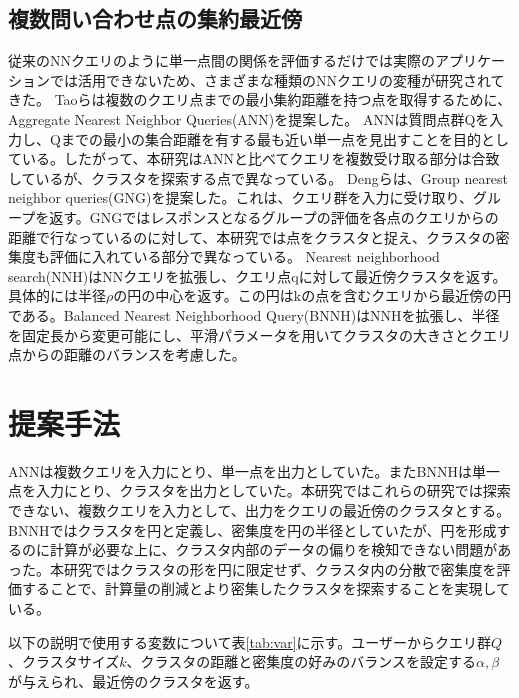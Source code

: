 \documentclass{deimj}
\theoremstyle{definition}
\begin{document}
\subsection{複数問い合わせ点の集約最近傍}
従来のNNクエリのように単一点間の関係を評価するだけでは実際のアプリケーションでは活用できないため、さまざまな種類のNNクエリの変種が研究されてきた。 Taoらは複数のクエリ点までの最小集約距離を持つ点を取得するために、Aggregate Nearest Neighbor Queries(ANN)\cite{ANN}を提案した。 ANNは質問点群Qを入力し、Qまでの最小の集合距離を有する最も近い単一点を見出すことを目的としている。したがって、本研究はANNと比べてクエリを複数受け取る部分は合致しているが、クラスタを探索する点で異なっている。 Dengらは、Group nearest neighbor queries(GNG)\cite{GNG}を提案した。これは、クエリ群を入力に受け取り、グループを返す。GNGではレスポンスとなるグループの評価を各点のクエリからの距離で行なっているのに対して、本研究では点をクラスタと捉え、クラスタの密集度も評価に入れている部分で異なっている。
Nearest neighborhood search(NNH)\cite{NNH}はNNクエリを拡張し、クエリ点qに対して最近傍クラスタを返す。具体的には半径$\rho$の円の中心を返す。この円はkの点を含むクエリから最近傍の円である。Balanced Nearest Neighborhood Query(BNNH)\cite{BNNH}はNNHを拡張し、半径を固定長から変更可能にし、平滑パラメータを用いてクラスタの大きさとクエリ点からの距離のバランスを考慮した。


\section{提案手法}

ANN\cite{ANN}は複数クエリを入力にとり、単一点を出力としていた。またBNNH\cite{BNNH}は単一点を入力にとり、クラスタを出力としていた。本研究ではこれらの研究では探索できない、複数クエリを入力として、出力をクエリの最近傍のクラスタとする。
BNNH\cite{BNNH}ではクラスタを円と定義し、密集度を円の半径としていたが、円を形成するのに計算が必要な上に、クラスタ内部のデータの偏りを検知できない問題があった。本研究ではクラスタの形を円に限定せず、クラスタ内の分散で密集度を評価することで、計算量の削減とより密集したクラスタを探索することを実現している。

以下の説明で使用する変数について表\ref{tab:var}に示す。ユーザーからクエリ群$Q$、クラスタサイズ$k$、クラスタの距離と密集度の好みのバランスを設定する$\alpha, \beta$が与えられ、最近傍のクラスタを返す。
\end{document}
